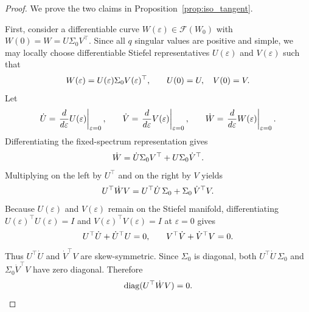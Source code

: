 \documentclass[11pt, a4paper]{utda}
\theoremstyle{plain}
\theoremstyle{definition}
\theoremstyle{remark}
\begin{document}
\begin{proof}
We prove the two claims in Proposition~\ref{prop:iso_tangent}.

First, consider a differentiable curve
$W(\varepsilon)\in\mathcal F(W_0)$ with
$W(0)=W=U\Sigma_0V^\top$. Since all $q$ singular values are positive and
simple, we may locally choose differentiable
Stiefel representatives $U(\varepsilon)$ and $V(\varepsilon)$ such that
\begin{equation}
\small
    W(\varepsilon)
    =
    U(\varepsilon)\Sigma_0 V(\varepsilon)^\top,
    \qquad
    U(0)=U,\quad V(0)=V .
\end{equation}
Let
\begin{equation}
\small
    \dot U
    =
    \left.\frac{d}{d\varepsilon}U(\varepsilon)\right|_{\varepsilon=0},
    \qquad
    \dot V
    =
    \left.\frac{d}{d\varepsilon}V(\varepsilon)\right|_{\varepsilon=0},
    \qquad
    \dot W
    =
    \left.\frac{d}{d\varepsilon}W(\varepsilon)\right|_{\varepsilon=0}.
\end{equation}
Differentiating the fixed-spectrum representation gives
\begin{equation}
\small
    \dot W
    =
    \dot U\Sigma_0 V^\top
    +
    U\Sigma_0 \dot V^\top .
\end{equation}
Multiplying on the left by $U^\top$ and on the right by $V$ yields
\begin{equation}
\small
    U^\top \dot W V
    =
    U^\top\dot U\,\Sigma_0
    +
    \Sigma_0\,\dot V^\top V .
\end{equation}
Because $U(\varepsilon)$ and $V(\varepsilon)$ remain on the Stiefel manifold,
differentiating
$U(\varepsilon)^\top U(\varepsilon)=I$ and
$V(\varepsilon)^\top V(\varepsilon)=I$ at $\varepsilon=0$ gives
\begin{equation}
\small
    U^\top\dot U+\dot U^\top U=0,
    \qquad
    V^\top\dot V+\dot V^\top V=0 .
\end{equation}
Thus $U^\top\dot U$ and $\dot V^\top V$ are skew-symmetric. Since $\Sigma_0$
is diagonal, both $U^\top\dot U\,\Sigma_0$ and
$\Sigma_0\dot V^\top V$ have zero diagonal. Therefore
\begin{equation}
\small
    \operatorname{diag}(U^\top \dot W V)=0 .
\end{equation}


\end{proof}
\end{document}
